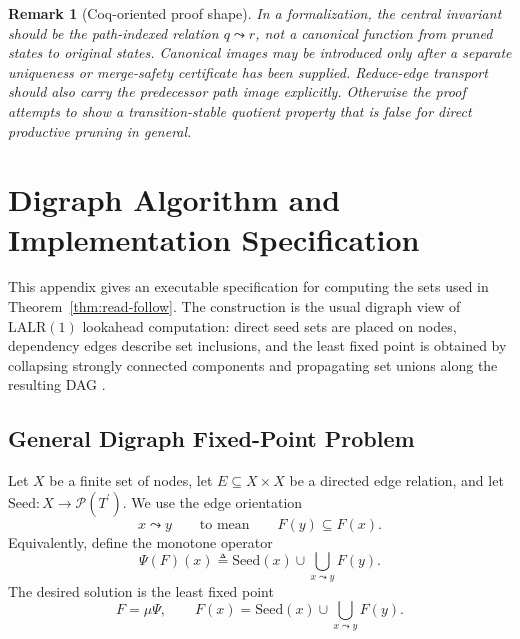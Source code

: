 \documentclass[11pt,a4paper]{article}
\theoremstyle{prettyplain}
\theoremstyle{prettydef}
\newtheorem*{remark}{Remark}
\newcommand{\Pow}{\ensuremath{\mathcal P}}
\newcommand{\LALRone}{\mathrm{LALR(1)}}
\begin{document}
\begin{remark}[Coq-oriented proof shape]
In a formalization, the central invariant should be the path-indexed relation
\(q\leadsto r\), not a canonical function from pruned states to original states.
Canonical images may be introduced only after a separate uniqueness or
merge-safety certificate has been supplied.  Reduce-edge transport should also
carry the predecessor path image explicitly.  Otherwise the proof attempts to
show a transition-stable quotient property that is false for direct productive
pruning in general.
\end{remark}

\appendix
\section{Digraph Algorithm and Implementation Specification}

This appendix gives an executable specification for computing the sets used in
Theorem~\ref{thm:read-follow}.  The construction is the usual digraph view of
\(\LALRone\) lookahead computation: direct seed sets are placed on nodes,
dependency edges describe set inclusions, and the least fixed point is obtained
by collapsing strongly connected components and propagating set unions along the
resulting DAG
\cite{DeRemerPennello1982,Tarjan1972,Gallier2008}.

\subsection{General Digraph Fixed-Point Problem}

Let \(X\) be a finite set of nodes, let \(E\subseteq X\times X\) be a directed
edge relation, and let \(\mathrm{Seed}:X\to\Pow(T^\prime)\).  We use the edge
orientation
\[
x\leadsto y
\qquad\text{to mean}\qquad
F(y)\subseteq F(x).
\]
Equivalently, define the monotone operator
\[
\Psi(F)(x)
\triangleq
\mathrm{Seed}(x)\cup\bigcup_{x\leadsto y}F(y).
\]
The desired solution is the least fixed point
\begin{equation}\label{eq:digraph}
F=\mu\Psi,
\qquad
F(x)=\mathrm{Seed}(x)\cup\bigcup_{x\leadsto y}F(y).
\end{equation}
\end{document}
